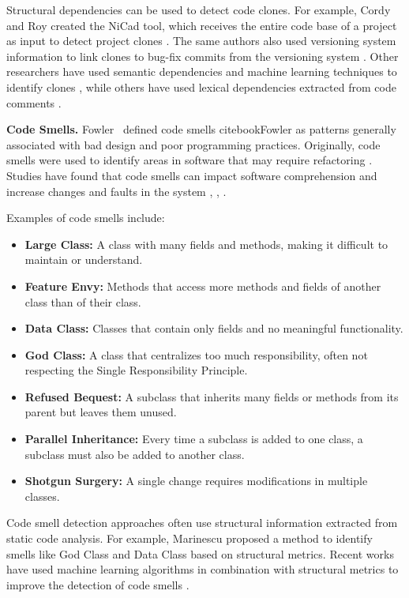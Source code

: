 Structural dependencies can be used to detect code clones. For example, Cordy and Roy created the NiCad tool, which receives the entire code base of a project as input to detect project clones \cite{clones-nicad}. The same authors also used versioning system information to link clones to bug-fix commits from the versioning system \cite{clones-nicad-git}. Other researchers have used semantic dependencies and machine learning techniques to identify clones \cite{clones-ml}, while others have used lexical dependencies extracted from code comments \cite{clones-comments}.

\textbf{Code Smells.}  
Fowler \ defined code smells cite{bookFowler} as patterns generally associated with bad design and poor programming practices. Originally, code smells were used to identify areas in software that may require refactoring \cite{articlesmells}. Studies have found that code smells can impact software comprehension and increase changes and faults in the system \cite{5741260}, \cite{5328703}, \cite{articlefault-proneness}.

Examples of code smells include:

\begin{itemize}
    \item \textbf{Large Class:} A class with many fields and methods, making it difficult to maintain or understand.
    \item \textbf{Feature Envy:} Methods that access more methods and fields of another class than of their class.
    \item \textbf{Data Class:} Classes that contain only fields and no meaningful functionality.
    \item \textbf{God Class:} A class that centralizes too much responsibility, often not respecting the Single Responsibility Principle.
    \item \textbf{Refused Bequest:} A subclass that inherits many fields or methods from its parent but leaves them unused.
    \item \textbf{Parallel Inheritance:} Every time a subclass is added to one class, a subclass must also be added to another class.
    \item \textbf{Shotgun Surgery:} A single change requires modifications in multiple classes.
\end{itemize}

Code smell detection approaches often use structural information extracted from static code analysis. For example, Marinescu \cite{Marinescu} proposed a method to identify smells like God Class and Data Class based on structural metrics. Recent works have used machine learning algorithms in combination with structural metrics to improve the detection of code smells \cite{code-smell-ml, PALOMBA20181}.

